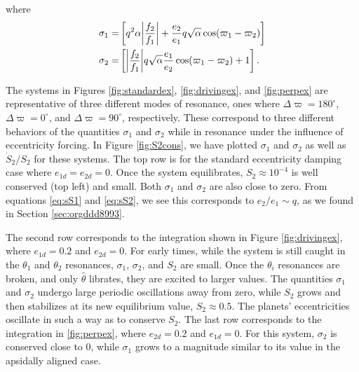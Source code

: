 \documentclass[usenatbib,twocolumn]{mnras}
\DeclarePairedDelimiter{\abs}{|}{|}
\begin{document}
\noindent
where
\begin{align}
  \label{eq:sS1}
  \sigma_1=&\left[
                  q^2\alpha\abs*{\frac{f_2}{f_1}}
                  + \frac{e_2}{e_1}q\sqrt{\alpha}\cos(\varpi_1-\varpi_2)
                  \right]\\
  \label{eq:sS2}
  \sigma_2=&\left[
                  \abs*{\frac{f_2}{f_1}} q\sqrt{\alpha}
                  \frac{e_1}{e_2}\cos(\varpi_1-\varpi_2) + 1
                  \right].
\end{align}

The systems in Figures \ref{fig:standardex}, \ref{fig:drivingex}, and
\ref{fig:perpex} are representative of three different modes of
resonance, ones where \(\Delta\varpi=180^\circ\),
\(\Delta\varpi=0^\circ\), and \(\Delta\varpi=90^\circ\),
respectively. These correspond to three different behaviors of the
quantities \(\sigma_1\) and \(\sigma_2\) while in resonance
under the influence of eccentricity forcing.
In Figure \ref{fig:S2cons}, we have plotted \(\sigma_1\) and
\(\sigma_2\) as well as \(\dot S_2/S_2\) for these systems.  The top
row is for the standard eccentricity damping case where
\(e_{1d}=e_{2d}=0\).  Once the system equilibrates, \(S_2\approx 10^{-4}\)
is well conserved (top left) and small. Both \(\sigma_1\) and
\(\sigma_2\) are also close to zero. From equations \eqref{eq:sS1}
and \eqref{eq:sS2}, we see this corresponds to \(e_2/e_1 \sim q\), as we
found in Section \ref{sec:orgddd8993}.

The second row corresponds to the integration shown in Figure
\ref{fig:drivingex}, where \(e_{1d}=0.2\) and \(e_{2d}=0\).  For early
times, while the system is still caught in the \(\theta_1\) and
\(\theta_2\) resonances, \(\sigma_1\), \(\sigma_2\), and \(S_2\) are
small.  Once the \(\theta_i\) resonances are broken, and only
\(\hat\theta\) librates, they are excited to larger values.  The
quantities \(\sigma_1\) and \(\sigma_2\) undergo large periodic
oscillations away from zero, while \(S_2\) grows and then stabilizes at
its new equilibrium value, \(S_2\approx 0.5\). The planets'
eccentricities oscillate in such a way as to conserve \(S_2\).  The last
row corresponds to the integration in \ref{fig:perpex}, where
\(e_{2d}=0.2\) and \(e_{1d}=0\).  For this system, \(\sigma_2\) is
conserved close to 0, while \(\sigma_1\) grows to a magnitude
similar to its value in the apsidally aligned case.
\end{document}
